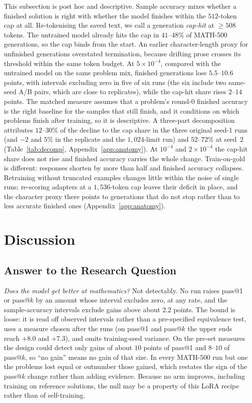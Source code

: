\documentclass[runningheads]{llncs}
\begin{document}
This subsection is post hoc and descriptive. Sample accuracy mixes whether a
finished solution is right with whether the model finishes within the
$512$-token cap at all. Re-tokenising the saved text, we call a generation
\emph{cap-hit} at $\ge508$ tokens. The untrained model already hits the cap in
$41$--$48\%$ of MATH-500 generations, so the cap binds from the start. An
earlier character-length proxy for unfinished generations overstated
termination, because drifting prose crosses its threshold within the same token
budget. At $5\times10^{-4}$, compared with the untrained model on the same
problem mix, finished generations lose $5.5$--$10.6$ points, with intervals
excluding zero in five of six runs (the six include two same-seed A/B pairs,
which are close to replicates), while the cap-hit share rises $2$--$14$ points.
The matched measure assumes that a problem's round-0 finished accuracy is the
right baseline for the samples that still finish, and it conditions on which
problems finish after training, so it is descriptive. A three-part
decomposition attributes $12$--$30\%$ of the decline to the cap share in the
three original seed-1 runs (and $-2$ and $5\%$ in the replicate and the
$1{,}024$-limit run) and $52$--$72\%$ at seed~2 (Table~\ref{tab:decomp}, Appendix~\ref{app:anatomy}). At
$10^{-4}$ and $2\times10^{-4}$ the cap-hit share does not rise and finished
accuracy carries the whole change. Train-on-gold is different: responses
shorten by more than half and finished accuracy collapses. Retraining without
truncated examples changes little within the noise of single runs; re-scoring
adapters at a $1{,}536$-token cap leaves their deficit in place, and the
character proxy there points to generations that do not stop rather than to
less accurate finished ones (Appendix~\ref{app:anatomy}).

\section{Discussion}
\label{sec:discussion}

\subsection{Answer to the Research Question}
\label{sec:answer}

\emph{Does the model get better at mathematics?} Not detectably. No run raises
pass@1 or pass@$k$ by an amount whose interval excludes zero, at any rate, and
the sample-accuracy intervals exclude gains above about $2.2$ points. The bound
is loose: it is read off observed intervals rather than a pre-specified
equivalence test, uses a measure chosen after the runs (on pass@1 and pass@$k$
the upper ends reach $+8.0$ and $+7.3$), and omits training-seed variance. On
the pre-set measures the design could detect only gains of about $10$ points
of pass@1 and $8$--$10$ of pass@$k$, so ``no gain'' means no gain of that size.
In every MATH-500 run but one the problems lost equal or outnumber those
gained, which restates the sign of the pass@$k$ change rather than adding
evidence. Because no arm improves, including training on reference
solutions, the null may be a property of this LoRA recipe rather than of
self-training.
\end{document}
